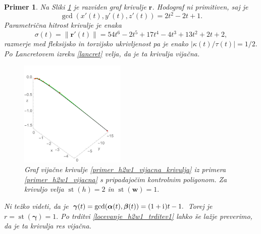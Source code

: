 \documentclass[12pt,a4paper,twoside]{article}
\newcommand{\iu}{\mathrm{i}\mkern1mu} %
\theoremstyle{definition} %
\theoremstyle{plain} %
\theoremstyle{primerstyle}
\newtheorem{primer}[definicija]{Primer}
\numberwithin{equation}{section}  %
\newcommand{\rV}{\mathbf{r}}
\newcommand{\wV}{\mathbf{w}}
\newcommand{\balpha}{\boldsymbol \alpha}
\newcommand{\bbeta}{\boldsymbol \beta}
\newcommand{\bgamma}{\boldsymbol \gamma}
\DeclareMathOperator{\st}{st}
\begin{document}
\begin{primer}
	Na Sliki \ref{fig:h2w1_vijacna} je razviden graf krivulje $\rV$. Hodograf ni primitiven, saj je $$\gcd(x'(t),y'(t),z'(t))=2t^2-2t+1.$$ Parametrična hitrost krivulje je enaka
	\begin{equation*}
		\sigma(t)=\lVert\rV'(t)\rVert=54t^6-2t^5+17t^4-4t^3+13t^2+2t+2,
	\end{equation*}
	razmerje med fleksijsko in torzijsko ukrivljenost pa je enako $|\kappa(t)/\tau(t)|=1/2.$ Po Lancretovem izreku \ref{lancret} velja, da je ta krivulja vijačna.
	\begin{figure}[h]
	  \centering
	  \includegraphics[width=0.45\textwidth]{images/h2w1_vijacna.pdf}
	  \caption[Primer vijačne krivulje ($\st(h)=2,$ $\st(\wV)=1$)]{Graf vijačne krivulje \eqref{primer_h2w1_vijacna_krivulja} iz primera \ref{primer_h2w1_vijacna} s pripadajočim kontrolnim poligonom. Za krivuljo velja $\st(h)=2$ in $\st(\wV)=1.$}
	  \label{fig:h2w1_vijacna}
	\end{figure}
	
	Ni težko videti, da je $\bgamma(t)=\gcd(\balpha(t),\bbeta(t))=(1+\iu)t-1.$ Torej je $r=\st(\bgamma)=1.$ Po trditvi \ref{locevanje_h2w1_trditev1} lahko še lažje preverimo, da je ta krivulja res vijačna.
\end{primer}
\end{document}
